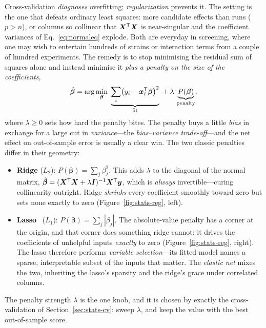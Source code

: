 Cross-validation \emph{diagnoses} overfitting; \emph{regularization} prevents it.
The setting is the one that defeats ordinary least squares: more candidate
effects than runs ($p>n$), or columns so collinear that $\bm X^{\mathsf{T}}\bm X$ is
near-singular and the coefficient variances of Eq.~\eqref{eq:normaleq} explode.
Both are everyday in screening, where one may wish to entertain hundreds of
strains or interaction terms from a couple of hundred experiments. The remedy is
to stop minimising the residual sum of squares alone and instead minimise it
\emph{plus a penalty on the size of the coefficients},
%
\begin{equation}
\hat{\bm\beta} = \arg\min_{\bm\beta}\;
   \underbrace{\sum_i\bigl(y_i-\bm x_i^{\mathsf{T}}\bm\beta\bigr)^2}_{\text{fit}}
   \;+\; \lambda\,\underbrace{P(\bm\beta)}_{\text{penalty}},
\label{eq:penalised}
\end{equation}
%
where $\lambda\ge0$ sets how hard the penalty bites. The penalty buys a little
\emph{bias} in exchange for a large cut in \emph{variance}---the
\emph{bias--variance trade-off}---and the net effect on out-of-sample error is
usually a clear win. The two classic penalties differ in their geometry:

\begin{itemize}
  \item \textbf{Ridge} ($L_2$): $P(\bm\beta)=\sum_j\beta_j^2$. This adds
  $\lambda$ to the diagonal of the normal matrix,
  $\hat{\bm\beta}=(\bm X^{\mathsf{T}}\bm X+\lambda\bm I)^{-1}\bm X^{\mathsf{T}}\bm y$, which
  is \emph{always} invertible---curing collinearity outright. Ridge
  \emph{shrinks} every coefficient smoothly toward zero but sets none exactly to
  zero (Figure~\ref{fig:stats-reg}, left).
  \item \textbf{Lasso}~\cite{tibshirani} ($L_1$): $P(\bm\beta)=\sum_j|\beta_j|$. The absolute-value
  penalty has a corner at the origin, and that corner does something ridge
  cannot: it drives the coefficients of unhelpful inputs \emph{exactly} to zero
  (Figure~\ref{fig:stats-reg}, right). The lasso therefore performs
  \emph{variable selection}---its fitted model names a sparse, interpretable
  subset of the inputs that matter. The \emph{elastic net} mixes the two,
  inheriting the lasso's sparsity and the ridge's grace under correlated columns.
\end{itemize}

The penalty strength $\lambda$ is the one knob, and it is chosen by exactly the
cross-validation of Section~\ref{sec:stats-cv}: sweep $\lambda$, and keep the
value with the best out-of-sample score.

